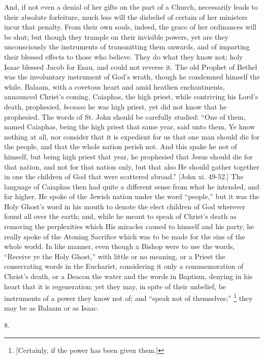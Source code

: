 And, if not even a denial of her gifts on the part of a Church,
necessarily leads to their absolute forfeiture, much less will the
disbelief of certain of her ministers incur that penalty. From their
own souls, indeed, the grace of her ordinances will be shut; but
though they trample on their invisible powers, yet are they
unconsciously the instruments of transmitting them onwards, and of
imparting their blessed effects to those who believe. They do what
they know not; holy Isaac blessed Jacob for Esau, and could not
reverse it. The old Prophet of Bethel was the involuntary instrument
of God's wrath, though he condemned himself the while. Balaam, with a
covetous heart and amid heathen enchantments, announced Christ's
coming. Caiaphas, the high priest, while contriving his Lord's death,
prophesied, \emph{because} he was high priest, yet did not know that
he prophesied. The words of St. John should be carefully studied:
``One of them, named Caiaphas, being the high priest that same
year, said unto them, Ye know nothing at all, nor consider that it is
expedient for us that one man should die for the people, and that the
whole nation perish not. And this spake he not of himself, but
being high priest that year, he prophesied that Jesus should die for
that nation, and not for that nation only, but that also He should
gather together in one the children of God that were scattered
abroad.'' [John xi. 49-52.] The language of Caiaphas then had
quite a different sense from what he intended, and far higher. He
spoke of the Jewish nation under the word ``people,'' but it
was the Holy Ghost's word in his mouth to denote the elect children of
God wherever found all over the earth; and, while he meant to speak of
Christ's death as removing the perplexities which His miracles caused
to himself and his party, he really spoke of the Atoning Sacrifice
which was to be made for the sins of the whole world. In like manner,
even though a Bishop were to use the words, ``Receive ye the Holy
Ghost,'' with little or no meaning, or a Priest the consecrating
words in the Eucharist, considering it only a commemoration of Christ's
death, or a Deacon the water and the words in Baptism, denying in his
heart that it is regeneration; yet they may, in spite of their
unbelief, be instruments of a power they know not of; and ``speak
not of themselves;'' \footnote{[Certainly, if the power has been given
them.]}
they may be as Balaam or as Isaac.

8.

